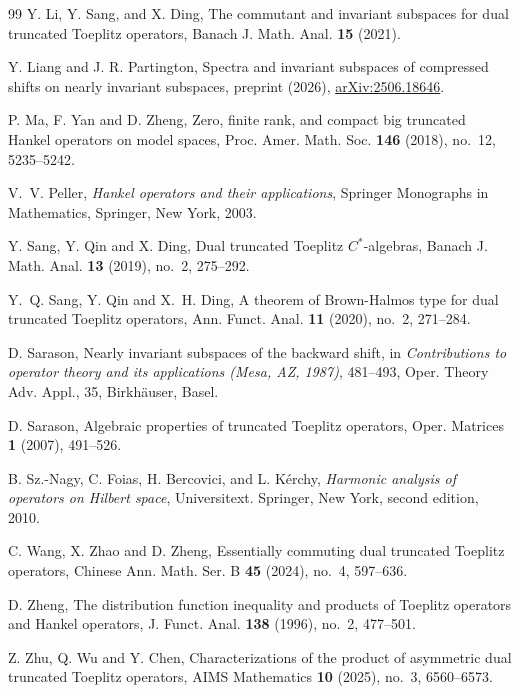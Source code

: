 \documentclass[12pt]{amsart}
\theoremstyle{definition}
\theoremstyle{remark}
\numberwithin{equation}{section}
\begin{document}
\begin{thebibliography}{99}
Y. Li, Y. Sang, and X. Ding, The commutant and invariant subspaces for dual truncated Toeplitz operators, Banach J. Math. Anal. {\bf 15} (2021).

Y. Liang and J. R. Partington, Spectra and invariant subspaces of compressed shifts on nearly invariant subspaces, preprint (2026), \href{https://arxiv.org/abs/2506.18646}{arXiv:2506.18646}.

P. Ma, F. Yan and D. Zheng, Zero, finite rank, and compact big truncated Hankel operators on model spaces, Proc. Amer. Math. Soc. {\bf 146} (2018), no.~12, 5235--5242.

V.~V. Peller, {\it Hankel operators and their applications}, Springer Monographs in Mathematics, Springer, New York, 2003.

Y. Sang, Y. Qin and X. Ding, Dual truncated Toeplitz $C^*$-algebras, Banach J. Math. Anal. {\bf 13} (2019), no.~2, 275--292.

Y.~Q. Sang, Y. Qin and X.~H. Ding, A theorem of Brown-Halmos type for dual truncated Toeplitz operators, Ann. Funct. Anal. {\bf 11} (2020), no.~2, 271--284.

D. Sarason, Nearly invariant subspaces of the backward shift, in {\it Contributions to operator theory and its applications (Mesa, AZ, 1987)}, 481--493, Oper. Theory Adv. Appl., 35, Birkh\"auser, Basel.

D. Sarason, Algebraic properties of truncated Toeplitz operators, Oper. Matrices {\bf 1} (2007), 491--526.

B. Sz.-Nagy, C. Foias, H. Bercovici, and L. K\'erchy, {\it Harmonic analysis of operators on Hilbert space}, Universitext. Springer, New York, second edition, 2010.

C. Wang, X. Zhao and D. Zheng, Essentially commuting dual truncated Toeplitz operators, Chinese Ann. Math. Ser. B {\bf 45} (2024), no.~4, 597--636.

D. Zheng, The distribution function inequality and products of Toeplitz operators and Hankel operators, J. Funct. Anal. {\bf 138} (1996), no.~2, 477--501.

Z. Zhu, Q. Wu and Y. Chen, Characterizations of the product of asymmetric dual truncated Toeplitz operators, AIMS Mathematics {\bf 10} (2025), no.~3, 6560--6573.

\end{thebibliography}
\end{document}
